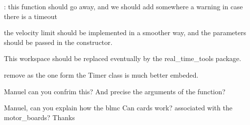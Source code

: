 
\begin{DoxyRefList}
\item[\label{todo__todo000003}%
\hypertarget{todo__todo000003}{}%
Member \hyperlink{classblmc__drivers_1_1CanBusMotorBoard_a19ffd7d9ef9a441299164485e85ec6fd}{blmc\+\_\+drivers\+:\+:Can\+Bus\+Motor\+Board\+:\+:pause\+\_\+motors} ()]\+: this function should go away, and we should add somewhere a warning in case there is a timeout  
\item[\label{todo__todo000002}%
\hypertarget{todo__todo000002}{}%
Class \hyperlink{classblmc__drivers_1_1SafeMotor}{blmc\+\_\+drivers\+:\+:Safe\+Motor} ]the velocity limit should be implemented in a smoother way, and the parameters should be passed in the constructor.  
\item[\label{todo__todo000004}%
\hypertarget{todo__todo000004}{}%
Namespace \hyperlink{namespaceosi}{osi} ]This workspace should be replaced eventually by the real\+\_\+time\+\_\+tools package.  
\item[\label{todo__todo000006}%
\hypertarget{todo__todo000006}{}%
Member \hyperlink{namespaceosi_a2409ab591c4f78d9a8bcfbbe38df9429}{osi\+:\+:get\+\_\+current\+\_\+time\+\_\+ms} ()]remove as the one form the Timer class is much better embeded. 
\item[\label{todo__todo000005}%
\hypertarget{todo__todo000005}{}%
Member \hyperlink{namespaceosi_a244466c0afc9ae9fe059cee665fb0603}{osi\+:\+:receive\+\_\+message\+\_\+from\+\_\+can\+\_\+device} (int fd, struct msghdr $\ast$msg, int flags)]Manuel can you confrim this? And precise the arguments of the function? 
\item[\label{todo__todo000001}%
\hypertarget{todo__todo000001}{}%
page \hyperlink{index}{This is the documentation of the blmc\+\_\+drivers package.} ]Manuel, can you explain how the blmc Can cards work? associated with the motor\+\_\+boards? Thanks
\end{DoxyRefList}